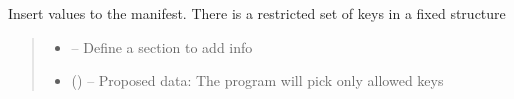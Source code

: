 \documentclass[letterpaper,10pt,english]{sphinxmanual}
\begin{document}
\begin{savenotes}
\begin{fulllineitems}

\begin{savenotes}\begin{fulllineitems}
\label{\detokenize{eezz:eezz.document.TManifest.scan}}
\pysigstartsignatures
{}
\pysigstopsignatures
\end{fulllineitems}\end{savenotes}


\begin{savenotes}\begin{fulllineitems}
\label{\detokenize{eezz:eezz.document.TManifest.set_values}}
\pysigstartsignatures
{}
\pysigstopsignatures
\sphinxAtStartPar
Insert values to the manifest. There is a restricted set of keys in a fixed structure
\begin{quote}\begin{description}
\begin{itemize}
\item {} 
\sphinxAtStartPar
{} – Define a section to add info

\item {} 
\sphinxAtStartPar
{} () – Proposed data: The program will pick only allowed keys

\end{itemize}

\end{description}\end{quote}

\end{fulllineitems}\end{savenotes}


\end{fulllineitems}\end{savenotes}
\end{document}
